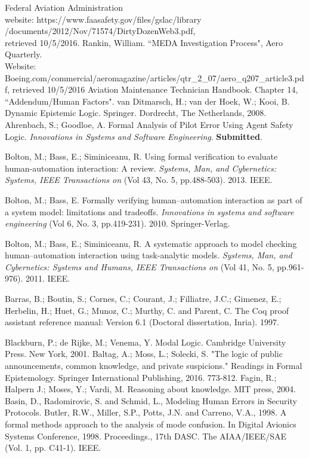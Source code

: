 \newpage
{}


%
\begin{thebibliography}{9}
	 	 Federal Aviation Administration \\ website: https://www.faasafety.gov/files/gslac/library\\/documents/2012/Nov/71574/DirtyDozenWeb3.pdf,\\
	 	retrieved 10/5/2016.
	 	 Rankin, William. ``MEDA Investigation Process", Aero Quarterly.\\ Website: Boeing.com/commercial/aeromagazine/articles/qtr\_2\_07/aero\_q207\_article3.pdf,
	 	retrieved 10/5/2016
	 	 Aviation Maintenance Technician Handbook. Chapter 14, ``Addendum/Human Factors". 
	 	 van Ditmarsch, H.; van der Hoek, W.; Kooi, B. Dynamic Epistemic Logic. Springer. Dordrecht, The Netherlands, 2008. 
	 	Ahrenbach, S.; Goodloe, A. Formal Analysis of Pilot Error Using Agent Safety Logic. {\em Innovations in Systems and Software Engineering}. {\bf Submitted}.
	 	
	 	Bolton, M.; Bass, E.; Siminiceanu, R. Using formal verification to evaluate human-automation interaction: A review. \emph{Systems, Man, and Cybernetics: Systems, IEEE Transactions on} (Vol 43, No. 5, pp.488-503). 2013. IEEE.
	 	
	 	Bolton, M.; Bass, E. Formally verifying human--automation interaction as part of a system model: limitations and tradeoffs. \emph{Innovations in systems and software engineering} (Vol 6, No. 3, pp.419-231). 2010. Springer-Verlag.
	 	
	 	Bolton, M.; Bass, E.; Siminiceanu, R. A systematic approach to model checking human--automation interaction using task-analytic models. \emph{Systems, Man, and Cybernetics: Systems and Humans, IEEE Transactions on} (Vol 41, No. 5, pp.961-976). 2011. IEEE.
	 	
	 	Barras, B.; Boutin, S.; Cornes, C.; Courant, J.; Filliatre, J.C.; Gimenez, E.; Herbelin, H.; Huet, G.; Munoz, C.; Murthy, C. and Parent, C. The Coq proof assistant reference manual: Version 6.1 (Doctoral dissertation, Inria). 1997.
	 	
	 	
	 	 Blackburn, P.; de Rijke, M.; Venema, Y. Modal Logic. Cambridge University Press. New York, 2001.
	 	 Baltag, A.; Moss, L.; Solecki, S. "The logic of public announcements, common knowledge, and private suspicions." Readings in Formal Epistemology. Springer International Publishing, 2016. 773-812.
	 	 Fagin, R.; Halpern J.; Moses, Y.; Vardi, M. Reasoning about knowledge. MIT press, 2004.
	 	 Basin, D., Radomirovic, S. and Schmid, L., Modeling Human Errors in Security Protocols.
	 	 Butler, R.W., Miller, S.P., Potts, J.N. and Carreno, V.A., 1998. A formal methods approach to the analysis of mode confusion. In Digital Avionics Systems Conference, 1998. Proceedings., 17th DASC. The AIAA/IEEE/SAE (Vol. 1, pp. C41-1). IEEE.
	 	

\end{thebibliography}
